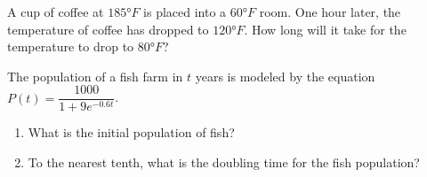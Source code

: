 \newpage

\begin{exercise}
  A cup of coffee at $185\unit{\degree F}$ is placed into a $60\unit{\degree F}$ room. One hour later, the temperature of coffee has dropped to $120\unit{\degree F}$. How long will it take for the temperature to drop to $80\unit{\degree F}$?
\end{exercise}

\begin{exercise}
  The population of a fish farm in $t$ years is modeled by the equation $P(t)=\dfrac{1000}{1+9e^{-0.6t}}$.
\begin{enumerate}
  \item What is the initial population of fish?
  \item To the nearest tenth, what is the doubling time for the fish population?
\end{enumerate}
\end{exercise}




